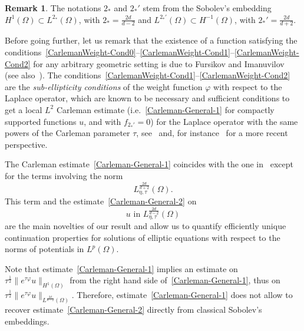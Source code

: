 \documentclass[10pt]{amsart}
\theoremstyle{definition}\newtheorem{defi}[theo]{Definition}\newtheorem{rema}[theo]{Remark}\newtheorem{exam}[theo]{Example}\newtheorem{exem}[theo]{Example}\newtheorem{nota}[theo]{Notation}
\begin{document}
\begin{rema}
The notations $2_*$ and $2_*'$ stem from the Sobolev's embedding $H^1(\Omega) \subset L^{2_*}(\Omega)$, with $2_* = \frac{2d}{d-2}$ and $L^{2_*'}(\Omega) \subset H^{-1}(\Omega)$, with $2_*' = \frac{2d}{d+2}$.
\end{rema}


Before going further, let us remark that the existence of a function satisfying the conditions~\eqref{CarlemanWeight-Cond0}--\eqref{CarlemanWeight-Cond1}--\eqref{CarlemanWeight-Cond2} for any arbitrary geometric setting is due to Fursikov and Imanuvilov~\cite[Lemma~1.1]{Fursikov1996-book} (see also~\cite[Proposition~3.31]{LeRousseaubookvolume1}). The conditions~\eqref{CarlemanWeight-Cond1}--\eqref{CarlemanWeight-Cond2} are the \emph{sub-ellipticity conditions} of the weight function $\varphi$ with respect to the Laplace operator, which are known to be necessary and sufficient conditions to get a local $L^2$ Carleman estimate (i.e.~\eqref{Carleman-General-1} for compactly supported functions $u$, and with $f_{2_*'} = 0$) for the Laplace operator with the same powers of the Carleman parameter $\tau$, see~\cite[Chapter~XXVIII]{hormanderanalysis4} and, for instance~\cite[Definition~3.2, Section~3.6 and Section~4.1.2]{LeRousseaubookvolume1} for a more recent perspective.


The Carleman estimate~\eqref{Carleman-General-1} coincides with the one in~\cite{imanuvilov2003global} except for the terms involving the norm
\[
L^{\frac{2d}{d+2}}_{\eta,\tau}(\Omega).
\]
This term and the estimate~\eqref{Carleman-General-2} on
\[
u \text{ in }L^{\frac{2d}{d-2}}_{\eta,\tau}(\Omega)
\]
are the main novelties of our result and allow us to quantify efficiently unique continuation properties for solutions of elliptic equations with respect to the norms of potentials in $L^p(\Omega)$.

Note that estimate~\eqref{Carleman-General-1} implies an estimate on $\tau^{\frac{1}{2}} \| e^{\tau \varphi} u\|_{H^1(\Omega)}$ from the right hand side of~\eqref{Carleman-General-1}, thus on $\tau^{\frac{1}{2}} \|e^{\tau \varphi} u\|_{L^{\frac{2d}{d-2}}(\Omega)}$. Therefore, estimate~\eqref{Carleman-General-1} does not allow to recover estimate~\eqref{Carleman-General-2} directly from classical Sobolev's embeddings.
\end{document}
